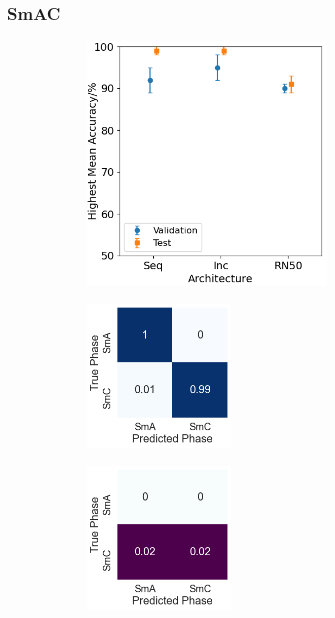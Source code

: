 \documentclass[12pt]{article}
\begin{document}
\subsubsection{SmAC}
\begin{figure}[!h]
\centering
\begin{subfigure}{0.4\textwidth}
	\centering
	\includegraphics[width=2.5in]{images/Graphs/SmAC.png}
	\caption{}
	\label{smac:graph}
\end{subfigure}%
\begin{subfigure}{0.25\textwidth}
	\centering
	\includegraphics[width=1.5in]{images/ConMats/SmAC_mean.png}
	\caption{}
	\label{smac:mean}
\end{subfigure}%
\begin{subfigure}{0.25\textwidth}
	\centering
	\includegraphics[width=1.5in]{images/ConMats/SmAC_std.png}
	\caption{}
	\label{smac:std}
\end{subfigure}%
\caption{}
\label{smac:smac}
\end{figure}
\end{document}
